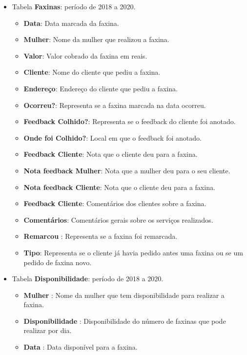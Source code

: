 \documentclass[
]{article}
\providecommand{\tightlist}{%
  \setlength{\itemsep}{0pt}\setlength{\parskip}{0pt}}
\begin{document}
\begin{itemize}
\tightlist
\item
  Tabela \textbf{Faxinas}: período de 2018 a 2020.

  \begin{itemize}
  \item
    \textbf{Data}: Data marcada da faxina.
  \item
    \textbf{Mulher}: Nome da mulher que realizou a faxina.
  \item
    \textbf{Valor}: Valor cobrado da faxina em reais.
  \item
    \textbf{Cliente}: Nome do cliente que pediu a faxina.
  \item
    \textbf{Endereço}: Endereço do cliente que pediu a faxina.
  \item
    \textbf{Ocorreu?}: Representa se a faxina marcada na data ocorreu.
  \item
    \textbf{Feedback Colhido?}: Representa se o feedback do cliente foi
    anotado.
  \item
    \textbf{Onde foi Colhido?}: Local em que o feedback foi anotado.
  \item
    \textbf{Feedback Cliente}: Nota que o cliente deu para a faxina.
  \item
    \textbf{Nota feedback Mulher}: Nota que a mulher deu para o seu
    cliente.
  \item
    \textbf{Nota feedback Cliente}: Nota que o cliente deu para a
    faxina.
  \item
    \textbf{Feedback Cliente}: Comentários dos clientes sobre a faxina.
  \item
    \textbf{Comentários}: Comentários gerais sobre os serviços
    realizados.
  \item
    \textbf{Remarcou} : Representa se a faxina foi remarcada.
  \item
    \textbf{Tipo}: Representa se o cliente já havia pedido antes uma
    faxina ou se um pedido de faxina novo.
  \end{itemize}
\item
  Tabela \textbf{Disponibilidade}: período de 2018 a 2020.

  \begin{itemize}
  \item
    \textbf{Mulher} : Nome da mulher que tem disponibilidade para
    realizar a faxina.
  \item
    \textbf{Disponibilidade} : Disponibilidade do número de faxinas que
    pode realizar por dia.
  \item
    \textbf{Data} : Data disponível para a faxina.
  \end{itemize}
\end{itemize}
\end{document}
